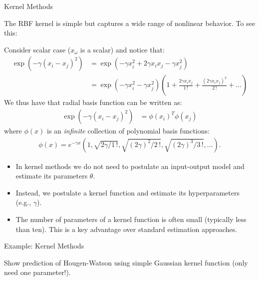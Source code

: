 \documentclass[9pt]{beamer}
\begin{document}
\begin{frame}{Kernel Methods}

The RBF kernel is simple but captures a wide range of nonlinear behavior. To see this:
\begin{block}{}
Consider scalar case ($x_\omega$ is a scalar) and notice that:
\begin{align*}
\exp(-\gamma(x_i-x_j)^2)&=\exp(-\gamma x_i^2+2\gamma x_ix_j-\gamma x_j^2)\\
&=\exp(-\gamma x_i^2-\gamma x_j^2)\left(1+\frac{2\gamma x_ix_j}{1\, !}+\frac{(2\gamma x_ix_j)^2}{2\,!}+...\right)
\end{align*}
We thus have that radial basis function can be written as:
\begin{align*}
\exp(-\gamma(x_i-x_j)^2)&=\phi(x_i)^T\phi(x_j)
\end{align*}
where $\phi(x)$ is an {\em infinite} collection of polynomial basis functions: 
\begin{align*}
\phi(x)=e^{-\gamma x}(1,\sqrt{2\gamma/1\,!},\sqrt{(2\gamma)^2/2\,!},\sqrt{(2\gamma)^3/3\,!},...). 
\end{align*}
\end{block}
\begin{itemize}
\item In kernel methods we do not need to postulate an input-output model and estimate its parameters $\theta$.  
\item Instead, we postulate a kernel function and estimate its hyperparameters (e.g., $\gamma$).  
\item The number of parameters of a kernel function is often small (typically less than ten). This is a key advantage over standard estimation approaches. 
\end{itemize}


\end{frame}

%
\begin{frame}{Example: Kernel Methods}

\begin{block}{}
Show prediction of Hougen-Watson using simple Gaussian kernel function (only need one parameter!). 
\end{block}

\end{frame}

\end{document}
